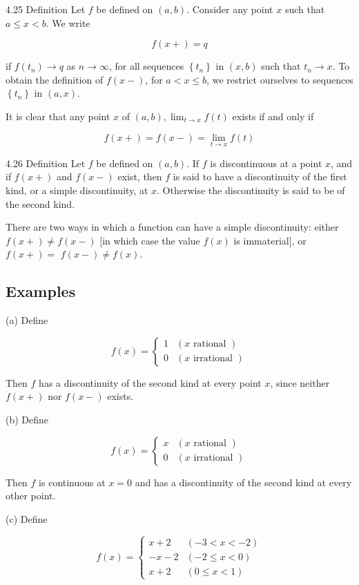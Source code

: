 \documentclass[10pt]{article}
\begin{document}
4.25 Definition Let $f$ be defined on $(a, b)$. Consider any point $x$ such that $a \leq x<b$. We write

$$
f(x+)=q
$$

if $f\left(t_{n}\right) \rightarrow q$ as $n \rightarrow \infty$, for all sequences $\left\{t_{n}\right\}$ in $(x, b)$ such that $t_{n} \rightarrow x$. To obtain the definition of $f(x-)$, for $a<x \leq b$, we restrict ourselves to sequences $\left\{t_{n}\right\}$ in $(a, x)$.

It is clear that any point $x$ of $(a, b), \lim _{t \rightarrow x} f(t)$ exists if and only if

$$
f(x+)=f(x-)=\lim _{t \rightarrow x} f(t)
$$

4.26 Definition Let $f$ be defined on $(a, b)$. If $f$ is discontinuous at a point $x$, and if $f(x+)$ and $f(x-)$ exist, then $f$ is said to have a discontinuity of the first kind, or a simple discontinuity, at $x$. Otherwise the discontinuity is said to be of the second kind.

There are two ways in which a function can have a simple discontinuity: either $f(x+) \neq f(x-)$ [in which case the value $f(x)$ is immaterial], or $f(x+)=$ $f(x-) \neq f(x)$.

\subsection{Examples}
(a) Define

$$
f(x)= \begin{cases}1 & (x \text { rational }) \\ 0 & (x \text { irrational })\end{cases}
$$

Then $f$ has a discontinuity of the second kind at every point $x$, since neither $f(x+)$ nor $f(x-)$ exists.

(b) Define

$$
f(x)= \begin{cases}x & (x \text { rational }) \\ 0 & (x \text { irrational })\end{cases}
$$

Then $f$ is continuous at $x=0$ and has a discontinuity of the second kind at every other point.

(c) Define

$$
f(x)= \begin{cases}x+2 & (-3<x<-2) \\ -x-2 & (-2 \leq x<0) \\ x+2 & (0 \leq x<1)\end{cases}
$$
\end{document}
